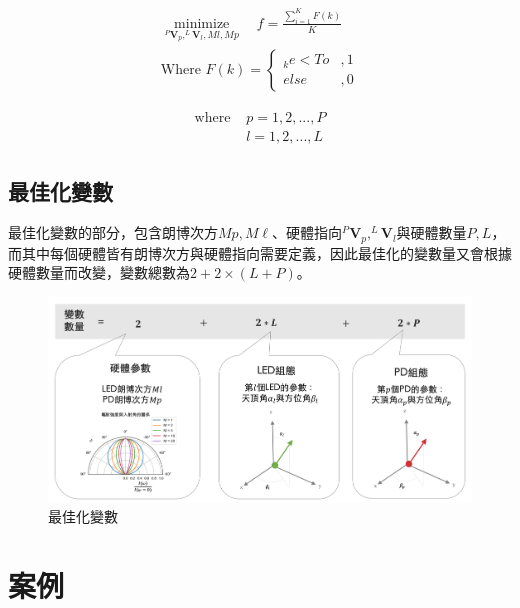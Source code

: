     \begin{equation}
        \label{eqn:objective}
        \begin{aligned}
        \underset{^{P}\boldsymbol{V}_p, ^{L}\boldsymbol{V}_l,Ml,Mp}{\operatorname{minimize}} 
        \quad f = 
        \frac{\sum_{i=1}^{K}F(k)}{K}  \\
        \text{Where }F(k)=
        \begin{cases}
            _{k}e<To&,1\\
            else&,0
        \end{cases}
        \end{aligned}
    \end{equation}

    \begin{align*} \text{where }
        &p=1,2,...,P\\&l=1,2,...,L
    \end{align*}


    \subsection{最佳化變數}
    \label{chp:optimize_variable}

    最佳化變數的部分，包含朗博次方$Mp,M\ell$、硬體指向$^{P}\boldsymbol{V}_p,^{L}\boldsymbol{V}_l$與硬體數量$P,L$，而其中每個硬體皆有朗博次方與硬體指向需要定義，因此最佳化的變數量又會根據硬體數量而改變，變數總數為$2+2\times(L+P)$。


    \begin{figure}[h!]
        \centering
        \includegraphics[width=15cm]{ch5pic/optimize_variable.png}
        \caption{最佳化變數}
        \label{pic:optimize_variable}
    \end{figure}



\section{案例}
\label{chp:optimize_case}

